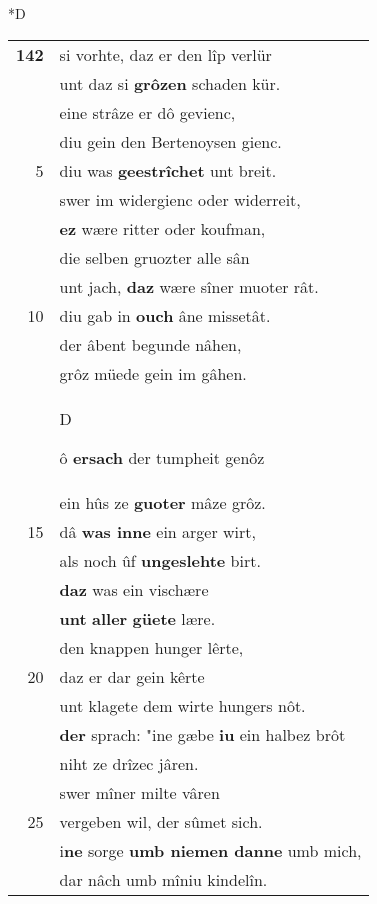 \documentclass[8pt,a4paper,notitlepage]{article}
\begin{document}
\begin{table}[ht]
\begin{minipage}[t]{0.5\linewidth}
\small
\begin{center}*D
\end{center}
\begin{tabular}{rl}
\textbf{142} & si vorhte, daz er den lîp verlür\\ 
 & unt daz si \textbf{grôzen} schaden kür.\\ 
 & eine strâze er dô gevienc,\\ 
 & diu gein den Bertenoysen gienc.\\ 
5 & diu was \textbf{geestrîchet} unt breit.\\ 
 & swer im widergienc oder widerreit,\\ 
 & \textbf{ez} wære ritter oder koufman,\\ 
 & die selben gruozter alle sân\\ 
 & unt jach, \textbf{daz} wære sîner muoter rât.\\ 
10 & diu gab in \textbf{ouch} âne missetât.\\ 
 & der âbent begunde nâhen,\\ 
 & grôz müede gein im gâhen.\\ 
 & \begin{large}D\end{large}ô \textbf{ersach} der tumpheit genôz\\ 
 & ein hûs ze \textbf{guoter} mâze grôz.\\ 
15 & dâ \textbf{was inne} ein arger wirt,\\ 
 & als noch ûf \textbf{ungeslehte} birt.\\ 
 & \textbf{daz} was ein vischære\\ 
 & \textbf{unt} \textbf{aller} \textbf{güete} lære.\\ 
 & den knappen hunger lêrte,\\ 
20 & daz er dar gein kêrte\\ 
 & unt klagete dem wirte hungers nôt.\\ 
 & \textbf{der} sprach: "ine gæbe \textbf{iu} ein halbez brôt\\ 
 & niht ze drîzec jâren.\\ 
 & swer mîner milte vâren\\ 
25 & vergeben wil, der sûmet sich.\\ 
 & i\textbf{ne} sorge \textbf{umb niemen danne} umb mich,\\ 
 & dar nâch umb mîniu kindelîn.\\ 

\end{tabular}
\end{minipage}
\end{table}
\end{document}
